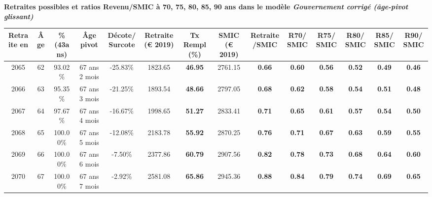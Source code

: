  \vspace{0.1cm} 
{\bf \noindent Retraites possibles et ratios Revenu/SMIC à 70, 75, 80, 85, 90 ans dans le modèle \emph{Gouvernement corrigé (âge-pivot glissant)}}  
 
\begin{adjustbox}{max width=\textwidth} 
\begin{tabular}[htb]{|c|c||c|c|c||c|c||c|c||c|c|c|c|c|} 
\hline 
 Retraite en &  Âge &  \%(43ans) &  Âge pivot &  Décote/Surcote &  Retraite (\euro{} 2019) &  Tx Rempl(\%) &  SMIC (\euro{} 2019) &  Retraite/SMIC &  R70/SMIC &  R75/SMIC &  R80/SMIC &  R85/SMIC &  R90/SMIC \\ 
\hline \hline 
 2065 &  62 &  93.02\% &  67 ans 2 mois &  -25.83\% &  1823.65 &  {\bf 46.95} &  2761.15 &  {\bf {\color{red} 0.66}} &  {\bf {\color{red} 0.60}} &  {\bf {\color{red} 0.56}} &  {\bf {\color{red} 0.52}} &  {\bf {\color{red} 0.49}} &  {\bf {\color{red} 0.46}} \\ 
\hline 
 2066 &  63 &  95.35\% &  67 ans 3 mois &  -21.25\% &  1893.54 &  {\bf 48.66} &  2797.05 &  {\bf {\color{red} 0.68}} &  {\bf {\color{red} 0.62}} &  {\bf {\color{red} 0.58}} &  {\bf {\color{red} 0.54}} &  {\bf {\color{red} 0.51}} &  {\bf {\color{red} 0.48}} \\ 
\hline 
 2067 &  64 &  97.67\% &  67 ans 4 mois &  -16.67\% &  1998.65 &  {\bf 51.27} &  2833.41 &  {\bf {\color{red} 0.71}} &  {\bf {\color{red} 0.65}} &  {\bf {\color{red} 0.61}} &  {\bf {\color{red} 0.57}} &  {\bf {\color{red} 0.54}} &  {\bf {\color{red} 0.50}} \\ 
\hline 
 2068 &  65 &  100.00\% &  67 ans 5 mois &  -12.08\% &  2183.78 &  {\bf 55.92} &  2870.25 &  {\bf {\color{red} 0.76}} &  {\bf {\color{red} 0.71}} &  {\bf {\color{red} 0.67}} &  {\bf {\color{red} 0.63}} &  {\bf {\color{red} 0.59}} &  {\bf {\color{red} 0.55}} \\ 
\hline 
 2069 &  66 &  100.00\% &  67 ans 6 mois &  -7.50\% &  2377.86 &  {\bf 60.79} &  2907.56 &  {\bf {\color{red} 0.82}} &  {\bf {\color{red} 0.78}} &  {\bf {\color{red} 0.73}} &  {\bf {\color{red} 0.68}} &  {\bf {\color{red} 0.64}} &  {\bf {\color{red} 0.60}} \\ 
\hline 
 2070 &  67 &  100.00\% &  67 ans 7 mois &  -2.92\% &  2581.08 &  {\bf 65.86} &  2945.36 &  {\bf {\color{red} 0.88}} &  {\bf {\color{red} 0.84}} &  {\bf {\color{red} 0.79}} &  {\bf {\color{red} 0.74}} &  {\bf {\color{red} 0.69}} &  {\bf {\color{red} 0.65}} \\ 
\hline 
\hline 
\end{tabular} 
\end{adjustbox} 
 
